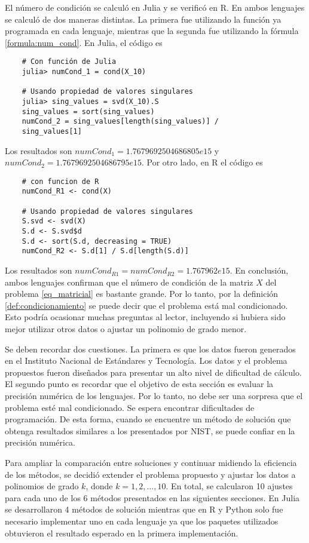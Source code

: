 El número de condición se calculó en \textsf{Julia} y se verificó en \textsf{R}. En ambos lenguajes se calculó de dos maneras distintas. La primera fue utilizando la función ya programada en cada lenguaje, mientras que la segunda fue utilizando la fórmula \ref{formula:num_cond}. En Julia, el código es 

\begin{verbatim}
	# Con función de Julia
	julia> numCond_1 = cond(X_10)
	
	# Usando propiedad de valores singulares
	julia> sing_values = svd(X_10).S
	sing_values = sort(sing_values)
	numCond_2 = sing_values[length(sing_values)] / 
	sing_values[1]
\end{verbatim}

Los resultados son $numCond_1 = 1.7679692504686805e15$ y $numCond_2 = 1.7679692504686795e15$. Por otro lado, en R el código es 

\begin{verbatim}
	# con funcion de R
	numCond_R1 <- cond(X)
	
	# Usando propiedad de valores singulares
	S.svd <- svd(X)
	S.d <- S.svd$d
	S.d <- sort(S.d, decreasing = TRUE)
	numCond_R2 <- S.d[1] / S.d[length(S.d)]
\end{verbatim}

Los resultados son $numCond_{R1} = numCond_{R2} = 1.767962e{15}$. En conclusión, ambos lenguajes confirman que el número de condición de la matriz $X$ del problema \ref{eq_matricial} es bastante grande. Por lo tanto, por la definición \ref{def:condicionamiento} se puede decir que el problema está mal condicionado. Esto podría ocasionar muchas preguntas al lector, incluyendo si hubiera sido mejor utilizar otros datos o ajustar un polinomio de grado menor. 

Se deben recordar dos cuestiones. La primera es que los datos fueron generados en el Instituto Nacional de Estándares y Tecnología. Los datos y el problema propuestos fueron diseñados para presentar un alto nivel de dificultad de cálculo. El segundo punto es recordar que el objetivo de esta sección es evaluar la precisión numérica de los lenguajes. Por lo tanto, no debe ser una sorpresa que el problema esté mal condicionado. Se espera encontrar dificultades de programación. De esta forma, cuando se encuentre un método de solución que obtenga resultados similares a los presentados por NIST, se puede confiar en la precisión numérica. 

Para ampliar la comparación entre soluciones y continuar midiendo la eficiencia de los métodos, se decidió extender el problema propuesto y ajustar los datos a polinomios de grado $k$, donde $k = 1, 2, \dots, 10$. En total, se calcularon 10 ajustes para cada uno de los 6 métodos presentados en las siguientes secciones. En \textsf{Julia} se desarrollaron 4 métodos de solución mientras que en \textsf{R} y \textsf{Python} solo fue necesario implementar uno en cada lenguaje ya que los paquetes utilizados obtuvieron el resultado esperado en la primera implementación.  

